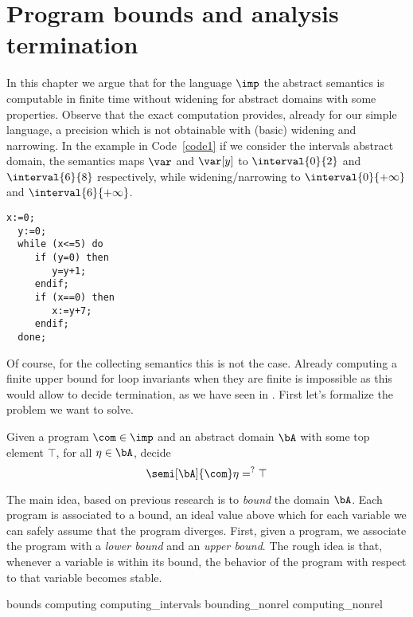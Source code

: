 \chapter{Program bounds and analysis termination}\label{ch:axiomatized}


In this chapter we argue that for the language \(\imp\) the abstract
semantics is computable in finite time without widening for abstract
domains with some properties.  Observe that the exact computation
provides, already for our simple language, a precision which is not
obtainable with (basic) widening and narrowing. In the example in
Code~\ref{code1} if we consider the intervals abstract domain, the
semantics maps \(\var\) and \(\var[y]\) to \(\interval{0}{2}\) and
\(\interval{6}{8}\) respectively, while widening/narrowing to
\(\interval{0}{+\infty}\) and \(\interval{6}{+\infty}\).

\begin{lstlisting}[caption=Code sample where analysis of
  \(\fix{\com}\) is less precise than \(\com^*\), label=code1,
  language=Imp]
  x:=0;
  y:=0;
  while (x<=5) do
     if (y=0) then
        y=y+1;
     endif;
     if (x==0) then
        x:=y+7;
     endif;
  done;
\end{lstlisting}

Of course, for the collecting semantics this is not the case. Already
computing a finite upper bound for loop invariants when they are
finite is impossible as this would allow to decide termination, as we
have seen in . First let's formalize the
problem we want to solve.

\begin{problem}\label{problem1}
  Given a program \(\com\in \imp\) and an abstract domain \(\bA\) with
  some top element \(\top\), for all \(\eta \in \bA\), decide
  \begin{equation*}
    \semi[\bA]{\com} \eta =^? \top
  \end{equation*}
\end{problem}

The main idea, based on previous research is to \emph{bound} the
domain \(\bA\). Each program is associated to a bound, an ideal value
above which for each variable we can safely assume that the program
diverges.  First, given a program, we associate the program with a
\emph{lower bound} and an \emph{upper bound}. The rough idea is that,
whenever a variable is within its bound, the behavior of the program
with respect to that variable becomes stable. %

{bounds}
{computing}
{computing_intervals}
{bounding_nonrel}
{computing_nonrel}
